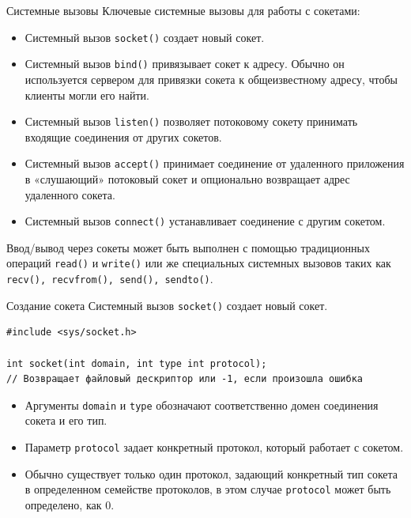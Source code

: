 \documentclass{beamer}
\begin{document}
\begin{frame}{Системные вызовы}
    Ключевые системные вызовы для работы с сокетами:
    \begin{itemize}
        \item Системный вызов \texttt{socket()} создает новый сокет.
        \item Системный вызов \texttt{bind()} привязывает сокет к адресу. Обычно он используется сервером для привязки сокета к общеизвестному адресу, чтобы клиенты могли его найти.
        \item Системный вызов \texttt{listen()} позволяет потоковому сокету принимать входящие соединения от других сокетов.
        \item Системный вызов \texttt{accept()} принимает соединение от удаленного приложения в «слушающий» потоковый сокет и опционально возвращает адрес удаленного сокета.
        \item Системный вызов \texttt{connect()} устанавливает соединение с другим сокетом.
    \end{itemize}
    
    Ввод/вывод через сокеты может быть выполнен с помощью традиционных операций \texttt{read()} и \texttt{write()} или же специальных системных вызовов таких как \texttt{recv(), recvfrom(), send(), sendto()}.
\end{frame}

\begin{frame}[fragile]{Создание сокета}
    Системный вызов \texttt{socket()} создает новый сокет.    
\begin{verbatim}
#include <sys/socket.h>

int socket(int domain, int type int protocol);
// Возвращает файловый дескриптор или -1, если произошла ошибка
\end{verbatim}
	
	\begin{itemize}
		\item Аргументы \texttt{domain} и \texttt{type} обозначают соответственно домен соединения сокета и его тип. 
		\item Параметр \texttt{protocol} задает конкретный протокол, который работает с сокетом. 
		\item Обычно существует только один протокол, задающий конкретный тип сокета в определенном семействе протоколов, в этом случае \texttt{protocol} может быть определено, как 0.  
	\end{itemize}  
\end{frame}
\end{document}
